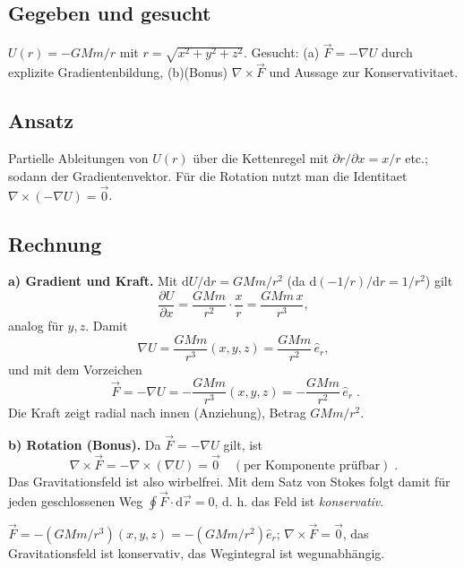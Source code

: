 
\subsection*{Gegeben und gesucht}
$U(r)=-GMm/r$ mit $r=\sqrt{x^2+y^2+z^2}$. Gesucht: (a) $\vec F=-\nabla U$
durch explizite Gradientenbildung, (b)(Bonus) $\nabla\times\vec F$ und
Aussage zur Konservativitaet.

\subsection*{Ansatz}
Partielle Ableitungen von $U(r)$ über die Kettenregel mit
$\partial r/\partial x=x/r$ etc.; sodann der Gradientenvektor. Für die
Rotation nutzt man die Identitaet $\nabla\times(-\nabla U)=\vec 0$.

\subsection*{Rechnung}
\textbf{a) Gradient und Kraft.} Mit
$\mathrm dU/\mathrm dr=GMm/r^2$ (da $\mathrm d(-1/r)/\mathrm dr=1/r^2$)
gilt
\begin{equation}
  \frac{\partial U}{\partial x}=\frac{GMm}{r^2}\cdot\frac{x}{r}
  =\frac{GMm\,x}{r^3},
\end{equation}
analog für $y,z$. Damit
\begin{equation}
  \nabla U=\frac{GMm}{r^3}(x,y,z)=\frac{GMm}{r^2}\,\hat e_r,
\end{equation}
und mit dem Vorzeichen
\begin{equation}
  \boxed{\;\vec F=-\nabla U=-\frac{GMm}{r^3}(x,y,z)
  =-\frac{GMm}{r^2}\,\hat e_r\;}.
\end{equation}
Die Kraft zeigt radial nach innen (Anziehung), Betrag $GMm/r^2$.

\textbf{b) Rotation (Bonus).} Da $\vec F=-\nabla U$ gilt, ist
\begin{equation}
  \nabla\times\vec F=-\nabla\times(\nabla U)=\vec 0
  \quad(\text{per Komponente prüfbar})\;.
\end{equation}
Das Gravitationsfeld ist also wirbelfrei. Mit dem Satz von Stokes folgt
damit für jeden geschlossenen Weg $\oint\vec F\cdot\mathrm d\vec r=0$,
d. h. das Feld ist \emph{konservativ}.

\begin{ergebnis}
$\vec F=-(GMm/r^3)(x,y,z)=-(GMm/r^2)\hat e_r$; $\nabla\times\vec F=\vec 0$,
das Gravitationsfeld ist konservativ, das Wegintegral ist wegunabhängig.
\end{ergebnis}

